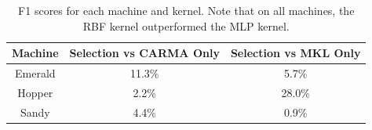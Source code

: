 \begin{table}[t]
    \begin{center}
        \begin{tabular}{c|c|c}
            Machine & Selection vs CARMA Only & Selection vs MKL Only \\ \hline
            Emerald & 11.3\% & 5.7\% \\
            Hopper & 2.2\% & 28.0\% \\
            Sandy & 4.4\% & 0.9\% \\
        \end{tabular}
    \end{center}
    \caption{F1 scores for each machine and kernel. Note that on all machines, the RBF kernel outperformed the MLP kernel.}
    \label{t:improvements}
\end{table}